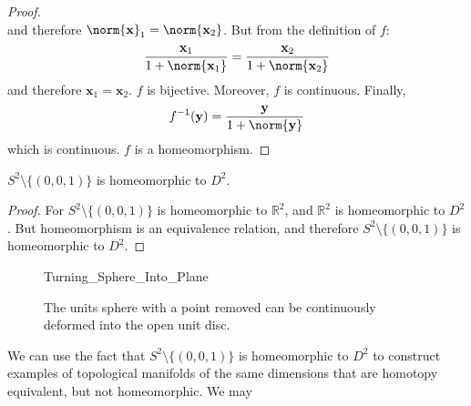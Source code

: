 \documentclass[crop=false,class=book,oneside]{standalone}
\begin{document}
\begin{proof}
\begin{equation}
                \end{equation}
                and therefore
                $\norm{\mathbf{x}}_{1}=\norm{\mathbf{x}_{2}}$.
                But from the definition of $f$:
                \begin{equation}
                    \frac{\mathbf{x}_{1}}{1+\norm{\mathbf{x}_{1}}}
                    =\frac{\mathbf{x}_{2}}{1+\norm{\mathbf{x}_{2}}}
                \end{equation}
                and therefore $\mathbf{x}_{1}=\mathbf{x}_{2}$.
                $f$ is bijective.
                Moreover, $f$ is continuous. Finally,
                \begin{equation}
                    f^{-1}(\mathbf{y})
                    =\frac{\mathbf{y}}{1+\norm{\mathbf{y}}}                    
                \end{equation}
                which is continuous. $f$ is a homeomorphism.
            \end{proof}
            \begin{theorem}
                $S^{2}\setminus\{(0,0,1)\}$ is homeomorphic to $D^{2}$.
            \end{theorem}
            \begin{proof}
                For $S^{2}\setminus\{(0,0,1)\}$ is
                homeomorphic to $\mathbb{R}^{2}$, and
                $\mathbb{R}^{2}$ is homeomorphic to $D^{2}$.
                But homeomorphism is an equivalence relation,
                and therefore $S^{2}\setminus\{(0,0,1)\}$
                is homeomorphic to $D^{2}$.
            \end{proof}
            \begin{figure}[H]
                \centering
                \captionsetup{type=figure}
                
                    {Turning_Sphere_Into_Plane}
                \caption[Homeomorphism Between $S^{2}\setminus\{(0,0,1)\}$ and $D^{2}$.]
                        {The units sphere with a point removed
                         can be continuously deformed into the
                         open unit disc.}
                \label{fig:surgery_theory_homeomorphism_%
                       S_2_wo_North_Pole_and_R_2}
            \end{figure}
            We can use the fact that $S^{2}\setminus \{(0,0,1)\}$
            is homeomorphic to $D^{2}$ to construct examples of
            topological manifolds of the same dimensions that are
            homotopy equivalent, but not homeomorphic. We may
\end{document}
